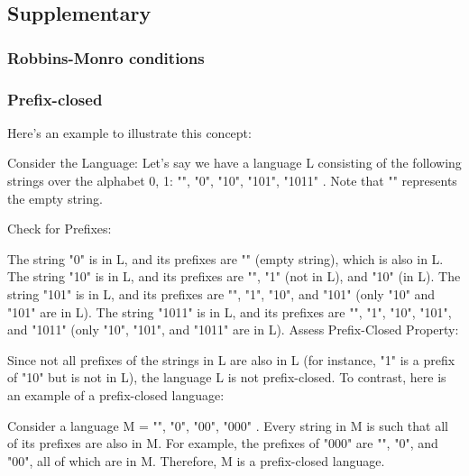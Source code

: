 \documentclass{article}
\begin{document}
\subsection{Supplementary}
\subsubsection{Robbins-Monro conditions}

\subsubsection{Prefix-closed}
Here's an example to illustrate this concept:

Consider the Language: Let's say we have a language L consisting of the following strings over the alphabet {0, 1}: { "", "0", "10", "101", "1011" }. Note that "" represents the empty string.

Check for Prefixes:

The string "0" is in L, and its prefixes are "" (empty string), which is also in L.
The string "10" is in L, and its prefixes are "", "1" (not in L), and "10" (in L).
The string "101" is in L, and its prefixes are "", "1", "10", and "101" (only "10" and "101" are in L).
The string "1011" is in L, and its prefixes are "", "1", "10", "101", and "1011" (only "10", "101", and "1011" are in L).
Assess Prefix-Closed Property:

Since not all prefixes of the strings in L are also in L (for instance, "1" is a prefix of "10" but is not in L), the language L is not prefix-closed.
To contrast, here is an example of a prefix-closed language:

Consider a language M = { "", "0", "00", "000" }.
Every string in M is such that all of its prefixes are also in M. For example, the prefixes of "000" are "", "0", and "00", all of which are in M.
Therefore, M is a prefix-closed language.
\end{document}
